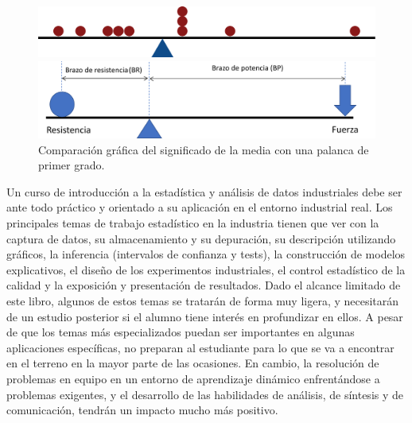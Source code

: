 \documentclass[
  letterpaper,
]{scrbook}
\begin{document}
\begin{figure}

\begin{minipage}[b]{0.50\linewidth}

{\centering 

\includegraphics{./01-imagenes/media-balanza.svg}

}

\end{minipage}%
%
\begin{minipage}[b]{0.50\linewidth}

{\centering 

\includegraphics{./01-imagenes/palanca.png}

}

\end{minipage}%

\caption{\label{fig-intro-media}Comparación gráfica del significado de
la media con una palanca de primer grado.}

\end{figure}

Un curso de introducción a la estadística y análisis de datos
industriales debe ser ante todo práctico y orientado a su aplicación en
el entorno industrial real. Los principales temas de trabajo estadístico
en la industria tienen que ver con la captura de datos, su
almacenamiento y su depuración, su descripción utilizando gráficos, la
inferencia (intervalos de confianza y tests), la construcción de modelos
explicativos, el diseño de los experimentos industriales, el control
estadístico de la calidad y la exposición y presentación de resultados.
Dado el alcance limitado de este libro, algunos de estos temas se
tratarán de forma muy ligera, y necesitarán de un estudio posterior si
el alumno tiene interés en profundizar en ellos. A pesar de que los
temas más especializados puedan ser importantes en algunas aplicaciones
específicas, no preparan al estudiante para lo que se va a encontrar en
el terreno en la mayor parte de las ocasiones. En cambio, la resolución
de problemas en equipo en un entorno de aprendizaje dinámico
enfrentándose a problemas exigentes, y el desarrollo de las habilidades
de análisis, de síntesis y de comunicación, tendrán un impacto mucho más
positivo.
\end{document}
